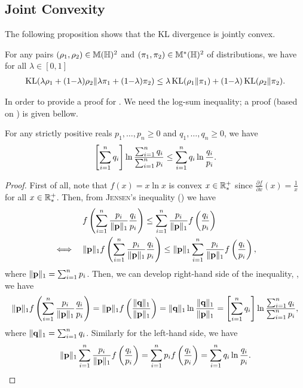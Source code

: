 \begin{noaddcontents}
\subsection{Joint Convexity}

The following proposition shows that the KL divergence is jointly convex.
\begin{proposition}
For any pairs $(\rho_1, \rho_2)\in\mathbb{M}(\mathbb{H})^2$ and $(\pi_1, \pi_2)\in\mathbb{M}^{*}(\mathbb{H})^2$ of distributions, we have for all $\lambda\in[0, 1]$
\begin{align*}
    \operatorname{KL}(\lambda\rho_1+(1{-}\lambda)\rho_2\|\lambda\pi_1+(1{-}\lambda)\pi_2) \le \lambda\operatorname{KL}(\rho_1\|\pi_1) + (1{-}\lambda)\operatorname{KL}(\rho_2\|\pi_2).
\end{align*}
\label{ap:pac-bayes:proposition:kl-convex}
\end{proposition}

In order to provide a proof for . 
We need the log-sum inequality; a proof (based on \citet[Theorem~2.7.1]{CoverThomas2006}) is given bellow.

\begin{lemma} For any strictly positive reals $p_1,\dots, p_n \ge 0$ and $q_1,\dots, q_n \ge 0$, we have
\begin{align*}
    \left[\sum_{i=1}^{n}q_i\right]\ln\frac{\sum_{i=1}^{n}q_i}{\sum_{i=1}^{n}p_i} \le \sum_{i=1}^{n}q_i\ln\frac{q_i}{p_i}.
\end{align*}
\label{ap:pac-bayes:lemma:log-sum}
\end{lemma}
\begin{proof}
First of all, note that $f(x)=x\ln x$ is convex \wrt $x\in\mathbb{R}_{*}^{+}$ since $\frac{\partial f}{\partial x}(x)=\frac{1}{x}$ for all $x\in\mathbb{R}_{*}^{+}$.
Then, from \textsc{Jensen}'s inequality () we have 
\begin{align*}
    &f\left(\sum_{i=1}^{n}\frac{p_i}{\|\textbf{\bf p}\|_1}\frac{q_i}{p_i}\right) \le \sum_{i=1}^{n}\frac{p_i}{\|\textbf{\bf p}\|_1}f\left(\frac{q_i}{p_i}\right)\\
    \iff\quad &\|\textbf{\bf p}\|_1f\left(\sum_{i=1}^{n}\frac{p_i}{\|\textbf{\bf p}\|_1}\frac{q_i}{p_i}\right) \le \|\textbf{\bf p}\|_1\sum_{i=1}^{n}\frac{p_i}{\|\textbf{\bf p}\|_1}f\left(\frac{q_i}{p_i}\right),
\end{align*}
where $\|\textbf{\bf p}\|_1=\sum_{i=1}^{n}p_i$.
Then, we can develop right-hand side of the inequality, \ie, we have
\begin{align*}
    \|\textbf{\bf p}\|_1f\left(\sum_{i=1}^{n}\frac{p_i}{\|\textbf{\bf p}\|_1}\frac{q_i}{p_i}\right) = \|\textbf{\bf p}\|_1f\left(\frac{\|\textbf{\bf q}\|_1}{\|\textbf{\bf p}\|_1}\right)=\|\textbf{\bf q}\|_1\ln\frac{\|\textbf{\bf q}\|_1}{\|\textbf{\bf p}\|_1}=\left[\sum_{i=1}^{n}q_i\right]\ln\frac{\sum_{i=1}^{n}q_i}{\sum_{i=1}^{n}p_i},
\end{align*}
where $\|\textbf{\bf q}\|_1=\sum_{i=1}^{n}q_i$.
Similarly for the left-hand side, we have 
\begin{align*}
    \|\textbf{\bf p}\|_1\sum_{i=1}^{n}\frac{p_i}{\|\textbf{\bf p}\|_1}f\left(\frac{q_i}{p_i}\right) = \sum_{i=1}^{n}p_if\left(\frac{q_i}{p_i}\right) = \sum_{i=1}^{n}q_i\ln\frac{q_i}{p_i}.
\end{align*}
\end{proof}


\end{noaddcontents}
